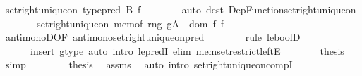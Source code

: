 \begin{isabellebody}
\ {\isachardoublequoteopen}set{\isacharunderscore}{\kern0pt}right{\isacharunderscore}{\kern0pt}unique{\isacharunderscore}{\kern0pt}on\ {\isacharparenleft}{\kern0pt}type{\isacharunderscore}{\kern0pt}pred\ B{\isacharparenright}{\kern0pt}\ f{\isachardoublequoteclose}\isanewline
\ \ \ \ \ \ \isamarkupfalse%
\ {\isacharparenleft}{\kern0pt}auto\ dest{\isacharcolon}{\kern0pt}\ Dep{\isacharunderscore}{\kern0pt}Function{\isacharunderscore}{\kern0pt}set{\isacharunderscore}{\kern0pt}right{\isacharunderscore}{\kern0pt}unique{\isacharunderscore}{\kern0pt}on{\isacharparenright}{\kern0pt}\isanewline
\ \ \ \ \isamarkupfalse%
\ \isamarkupfalse%
\ {\isachardoublequoteopen}set{\isacharunderscore}{\kern0pt}right{\isacharunderscore}{\kern0pt}unique{\isacharunderscore}{\kern0pt}on\ {\isacharparenleft}{\kern0pt}mem{\isacharunderscore}{\kern0pt}of\ {\isacharparenleft}{\kern0pt}rng\ g{\isasymrestriction}\isactrlbsub A\isactrlesub \ {\isasyminter}\ dom\ f{\isacharparenright}{\kern0pt}{\isacharparenright}{\kern0pt}\ f{\isachardoublequoteclose}\isanewline
\ \ \ \ \ \ \isamarkupfalse%
\ antimonoD{\isacharbrackleft}{\kern0pt}OF\ antimono{\isacharunderscore}{\kern0pt}set{\isacharunderscore}{\kern0pt}right{\isacharunderscore}{\kern0pt}unique{\isacharunderscore}{\kern0pt}on{\isacharunderscore}{\kern0pt}pred{\isacharbrackright}{\kern0pt}\isanewline
\ \ \ \ \ \ \isamarkupfalse%
\ {\isacharparenleft}{\kern0pt}rule\ le{\isacharunderscore}{\kern0pt}boolD{\isacharprime}{\kern0pt}{\isacharprime}{\kern0pt}{\isacharparenright}{\kern0pt}\isanewline
\ \ \ \ \ \ {\isacharparenleft}{\kern0pt}insert\ g{\isacharunderscore}{\kern0pt}type{\isacharcomma}{\kern0pt}\ auto\ intro{\isacharbang}{\kern0pt}{\isacharcolon}{\kern0pt}\ le{\isacharunderscore}{\kern0pt}predI\ elim{\isacharbang}{\kern0pt}{\isacharcolon}{\kern0pt}\ mem{\isacharunderscore}{\kern0pt}set{\isacharunderscore}{\kern0pt}restrict{\isacharunderscore}{\kern0pt}leftE{\isacharparenright}{\kern0pt}\isanewline
\ \ \ \ \isamarkupfalse%
\ \isamarkupfalse%
\ {\isacharquery}{\kern0pt}thesis\ \isamarkupfalse%
\ simp\isanewline
\ \ \isamarkupfalse%
\isanewline
\ \ \isamarkupfalse%
\ \isamarkupfalse%
\ {\isacharquery}{\kern0pt}thesis\ \isamarkupfalse%
\ assms\ \isamarkupfalse%
\ {\isacharparenleft}{\kern0pt}auto\ intro{\isacharbang}{\kern0pt}{\isacharcolon}{\kern0pt}\ set{\isacharunderscore}{\kern0pt}right{\isacharunderscore}{\kern0pt}unique{\isacharunderscore}{\kern0pt}on{\isacharunderscore}{\kern0pt}compI\isanewline

\end{isabellebody}
